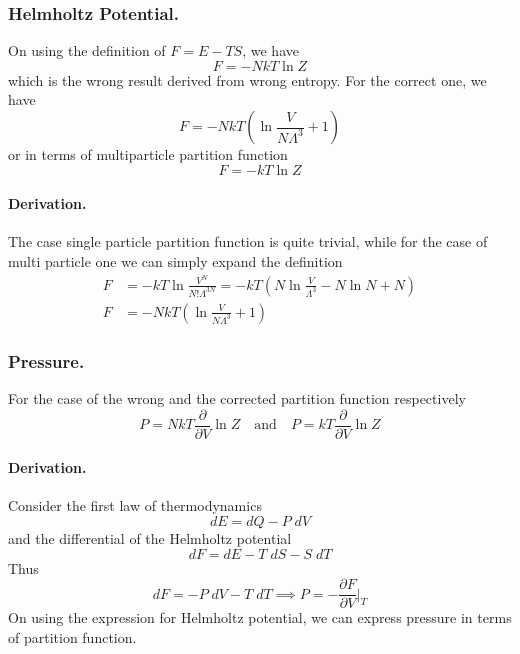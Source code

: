 \documentclass[../../../Main.tex]{subfiles}
\begin{document}
\subsubsection*{Helmholtz Potential.} On using the definition of $F=E-TS$, we have
\begin{equation*}
	F=-NkT\ln Z
\end{equation*}
which is the wrong result derived from wrong entropy. For the correct one, we have
\begin{equation*}
	F=-NkT\left(\ln \frac{V}{N\Lambda^3}+1\right)
\end{equation*}
or in terms of multiparticle partition function
\begin{equation*}
	F=-kT\ln Z
\end{equation*}

\paragraph*{Derivation.} The case single particle partition function is quite trivial, while for the case of multi particle one we can simply expand the definition
\begin{align*}
	F & =-kT\ln \frac{V^N}{N!\Lambda^{3N}}=-kT\left(N\ln\frac{V}{\Lambda^3}-N\ln N+N\right) \\
	F & =-NkT\left(\ln \frac{V}{N\Lambda^3}+1\right)
\end{align*}

\subsubsection*{Pressure.} For the case of the wrong and the corrected partition function respectively
\begin{equation*}
	P=NkT\frac{\partial}{\partial V} \ln Z\quad\text{and}\quad P=kT\frac{\partial}{\partial V} \ln Z
\end{equation*}

\paragraph*{Derivation.} Consider the first law of thermodynamics
\begin{equation*}
	dE=dQ-P\;dV
\end{equation*}
and the differential of the Helmholtz potential
\begin{equation*}
	dF=dE-T\;dS-S\;dT
\end{equation*}
Thus
\begin{equation*}
	dF=-P\;dV-T\;dT\implies P=-\frac{\partial F}{\partial V}\bigg|_{T}
\end{equation*}
On using the expression for Helmholtz potential, we can express pressure in terms of partition function.
\end{document}
